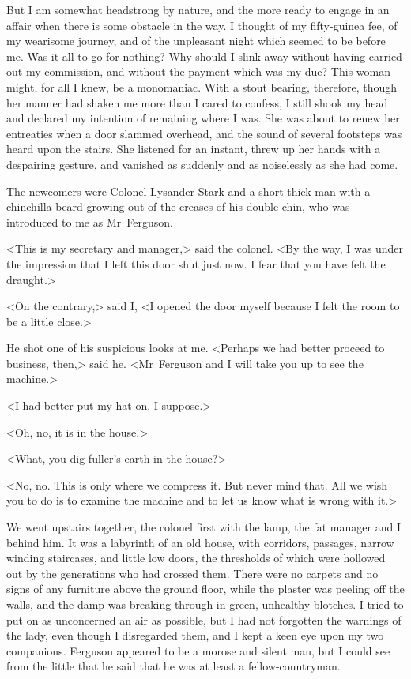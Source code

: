 But I am somewhat headstrong by nature, and the more ready to engage in an affair when there is some obstacle in the way. I thought of my fifty-guinea fee, of my wearisome journey, and of the unpleasant night which seemed to be before me. Was it all to go for nothing? Why should I slink away without having carried out my commission, and without the payment which was my due? This woman might, for all I knew, be a monomaniac. With a stout bearing, therefore, though her manner had shaken me more than I cared to confess, I still shook my head and declared my intention of remaining where I was. She was about to renew her entreaties when a door slammed overhead, and the sound of several footsteps was heard upon the stairs. She listened for an instant, threw up her hands with a despairing gesture, and vanished as suddenly and as noiselessly as she had come.

The newcomers were Colonel Lysander Stark and a short thick man with a chinchilla beard growing out of the creases of his double chin, who was introduced to me as Mr~Ferguson.

<This is my secretary and manager,> said the colonel. <By the way, I was under the impression that I left this door shut just now. I fear that you have felt the draught.>

<On the contrary,> said I, <I opened the door myself because I felt the room to be a little close.>

He shot one of his suspicious looks at me. <Perhaps we had better proceed to business, then,> said he. <Mr~Ferguson and I will take you up to see the machine.>

<I had better put my hat on, I suppose.>

<Oh, no, it is in the house.>

<What, you dig fuller's-earth in the house?>

<No, no. This is only where we compress it. But never mind that. All we wish you to do is to examine the machine and to let us know what is wrong with it.>

We went upstairs together, the colonel first with the lamp, the fat manager and I behind him. It was a labyrinth of an old house, with corridors, passages, narrow winding staircases, and little low doors, the thresholds of which were hollowed out by the generations who had crossed them. There were no carpets and no signs of any furniture above the ground floor, while the plaster was peeling off the walls, and the damp was breaking through in green, unhealthy blotches. I tried to put on as unconcerned an air as possible, but I had not forgotten the warnings of the lady, even though I disregarded them, and I kept a keen eye upon my two companions. Ferguson appeared to be a morose and silent man, but I could see from the little that he said that he was at least a fellow-countryman.

